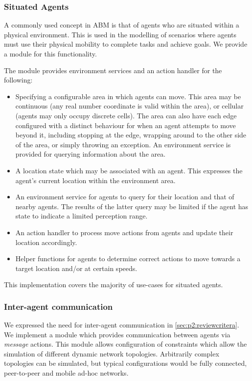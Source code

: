 \subsubsection*{Situated Agents}

A commonly used concept in \ac{ABM} is that of agents who are situated within a
physical environment. This is used in the modelling of scenarios where agents
must use their physical mobility to complete tasks and achieve goals. We provide
a module for this functionality.

The module provides environment services and an action handler for the
following:
\begin{itemize}
	\item Specifying a configurable area in which agents can move. This area may be
	continuous (any real number coordinate is valid within the area), or cellular 
	(agents may only occupy discrete cells). The area can also have each edge
	configured with a distinct behaviour for when an agent attempts to move beyond it,
	including stopping at the edge, wrapping around to the other side of the area,
	or simply throwing an exception. An environment service is provided for 
	querying information about the area.
	\item A location state which may be associated with an agent. This expresses
	the agent's current location within the environment area.
	\item An environment service for agents to query for their location and that of
	nearby agents. The results of the latter query may be limited if the agent has
	state to indicate a limited perception range.
	\item An action handler to process move actions from agents and update their
	location accordingly.
	\item Helper functions for agents to determine correct actions to move towards
	a target location and/or at certain speeds.
\end{itemize}

This implementation covers the majority of use-cases for situated agents.

\subsubsection*{Inter-agent communication}

We expressed the need for inter-agent communication in \autoref{sec:p2:reviewcritera}.
We implement a module which provides communication between agents via \emph{
message} actions. This module allows configuration of constraints which allow the
simulation of different dynamic network topologies. Arbitrarily complex
topologies can be simulated, but typical configurations would be fully
connected, peer-to-peer and mobile ad-hoc networks.

